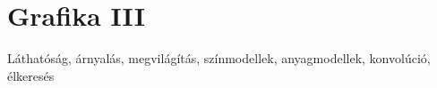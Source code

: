 \documentclass[../../main.tex]{subfiles}
\begin{document}
\section{Grafika III}

\begin{fulltheorem}
	Láthatóság, árnyalás, megvilágítás, színmodellek, anyagmodellek, konvolúció, élkeresés
\end{fulltheorem}
\end{document}
